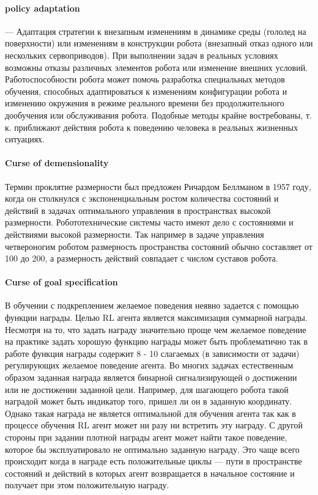 \paragraph{policy adaptation} --- Адаптация стратегии к внезапным изменениям в динамике среды (гололед на поверхности) или изменениям в конструкции робота (внезапный отказ одного или нескольких сервоприводов). При выполнении задач в реальных условиях возможны отказы различных элементов робота или изменение внешних условий. Работоспособности робота может помочь разработка специальных методов обучения, способных адаптироваться к изменениям конфигурации робота и изменению окружения в режиме реального времени без продолжительного дообучения или обслуживания робота. Подобные методы крайне востребованы, т. к. приближают действия робота к поведению человека в реальных жизненных ситуациях.

\paragraph{Curse of demensionality}

Термин проклятие размерности был предложен Ричардом Беллманом в 1957 году, когда он столкнулся с экспоненциальным ростом количества состояний и действий в задачах оптимального управления в пространствах высокой размерности. Робототехнические системы часто имеют дело с состояниями и действиями высокой размерности. Так например в задаче управления четвероногим роботом размерность пространства состояний обычно составляет от 100 до 200, а размерность действий совпадает с числом суставов робота. 

\paragraph{Curse of goal specification}
В обучении с подкреплением желаемое поведения неявно задается с помощью функции награды. Целью RL агента является максимизация суммарной награды. Несмотря на то, что задать награду значительно проще чем желаемое поведение на практике задать хорошую функцию награды может быть проблематично так в работе \cite{hwangbo2019learning} функция награды содержит 8 - 10 слагаемых (в зависимости от задачи) регулирующих желаемое поведение агента. 
Во многих задачах естественным образом заданная награда является бинарной сигнализирующей о достижении или не достижении заданной цели. Например, для шагающего робота такой наградой может быть индикатор того, пришел ли он в заданную координату. Однако такая награда не является оптимальной для обучения агента так как в процессе обучения RL агент может ни разу ни встретить эту награду. 
С другой стороны при задании плотной награды агент может найти такое поведение, которое бы эксплуатировало не оптимально заданную награду. Это чаще всего происходит когда в награде есть положительные циклы --- пути в пространстве состояний и действий в которых агент возвращается в начальное состояние и получает при этом положительную награду. 




\FloatBarrier
